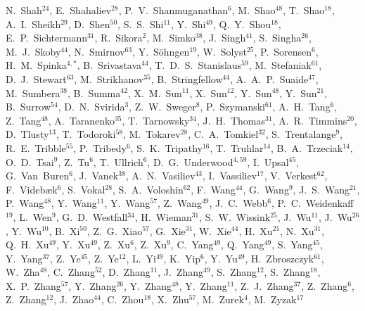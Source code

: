 {N.~Shah$^{24}$,
E.~Shahaliev$^{28}$,
P.~V.~Shanmuganathan$^{6}$,
M.~Shao$^{48}$,
T.~Shao$^{18}$,
A.~I.~Sheikh$^{29}$,
D.~Shen$^{50}$,
S.~S.~Shi$^{11}$,
Y.~Shi$^{49}$,
Q.~Y.~Shou$^{18}$,
E.~P.~Sichtermann$^{31}$,
R.~Sikora$^{2}$,
M.~Simko$^{38}$,
J.~Singh$^{41}$,
S.~Singha$^{26}$,
M.~J.~Skoby$^{44}$,
N.~Smirnov$^{63}$,
Y.~S\"{o}hngen$^{19}$,
W.~Solyst$^{25}$,
P.~Sorensen$^{6}$,
H.~M.~Spinka$^{4,*}$,
B.~Srivastava$^{44}$,
T.~D.~S.~Stanislaus$^{59}$,
M.~Stefaniak$^{61}$,
D.~J.~Stewart$^{63}$,
M.~Strikhanov$^{35}$,
B.~Stringfellow$^{44}$,
A.~A.~P.~Suaide$^{47}$,
M.~Sumbera$^{38}$,
B.~Summa$^{42}$,
X.~M.~Sun$^{11}$,
X.~Sun$^{12}$,
Y.~Sun$^{48}$,
Y.~Sun$^{21}$,
B.~Surrow$^{54}$,
D.~N.~Svirida$^{3}$,
Z.~W.~Sweger$^{8}$,
P.~Szymanski$^{61}$,
A.~H.~Tang$^{6}$,
Z.~Tang$^{48}$,
A.~Taranenko$^{35}$,
T.~Tarnowsky$^{34}$,
J.~H.~Thomas$^{31}$,
A.~R.~Timmins$^{20}$,
D.~Tlusty$^{13}$,
T.~Todoroki$^{58}$,
M.~Tokarev$^{28}$,
C.~A.~Tomkiel$^{32}$,
S.~Trentalange$^{9}$,
R.~E.~Tribble$^{55}$,
P.~Tribedy$^{6}$,
S.~K.~Tripathy$^{16}$,
T.~Truhlar$^{14}$,
B.~A.~Trzeciak$^{14}$,
O.~D.~Tsai$^{9}$,
Z.~Tu$^{6}$,
T.~Ullrich$^{6}$,
D.~G.~Underwood$^{4,59}$,
I.~Upsal$^{45}$,
G.~Van~Buren$^{6}$,
J.~Vanek$^{38}$,
A.~N.~Vasiliev$^{43}$,
I.~Vassiliev$^{17}$,
V.~Verkest$^{62}$,
F.~Videb{\ae}k$^{6}$,
S.~Vokal$^{28}$,
S.~A.~Voloshin$^{62}$,
F.~Wang$^{44}$,
G.~Wang$^{9}$,
J.~S.~Wang$^{21}$,
P.~Wang$^{48}$,
Y.~Wang$^{11}$,
Y.~Wang$^{57}$,
Z.~Wang$^{49}$,
J.~C.~Webb$^{6}$,
P.~C.~Weidenkaff$^{19}$,
L.~Wen$^{9}$,
G.~D.~Westfall$^{34}$,
H.~Wieman$^{31}$,
S.~W.~Wissink$^{25}$,
J.~Wu$^{11}$,
J.~Wu$^{26}$,
Y.~Wu$^{10}$,
B.~Xi$^{50}$,
Z.~G.~Xiao$^{57}$,
G.~Xie$^{31}$,
W.~Xie$^{44}$,
H.~Xu$^{21}$,
N.~Xu$^{31}$,
Q.~H.~Xu$^{49}$,
Y.~Xu$^{49}$,
Z.~Xu$^{6}$,
Z.~Xu$^{9}$,
C.~Yang$^{49}$,
Q.~Yang$^{49}$,
S.~Yang$^{45}$,
Y.~Yang$^{37}$,
Z.~Ye$^{45}$,
Z.~Ye$^{12}$,
L.~Yi$^{49}$,
K.~Yip$^{6}$,
Y.~Yu$^{49}$,
H.~Zbroszczyk$^{61}$,
W.~Zha$^{48}$,
C.~Zhang$^{52}$,
D.~Zhang$^{11}$,
J.~Zhang$^{49}$,
S.~Zhang$^{12}$,
S.~Zhang$^{18}$,
X.~P.~Zhang$^{57}$,
Y.~Zhang$^{26}$,
Y.~Zhang$^{48}$,
Y.~Zhang$^{11}$,
Z.~J.~Zhang$^{37}$,
Z.~Zhang$^{6}$,
Z.~Zhang$^{12}$,
J.~Zhao$^{44}$,
C.~Zhou$^{18}$,
X.~Zhu$^{57}$,
M.~Zurek$^{4}$,
M.~Zyzak$^{17}$
}

\address{\rm{(STAR Collaboration)}}

